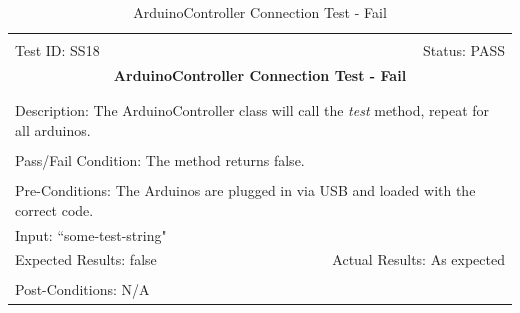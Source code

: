 \documentclass[11pt]{article}
\begin{document}
\begin{center}
\begin{table}[H]
\begin{tabular}{|l r|}\hline&\\[-2mm]
	Test ID: SS18	&Status: PASS\\[-3mm]
	\multicolumn{2}{|c|}{\textbf{\large{ArduinoController Connection Test - Fail}}}\\&\\\hline&\\[-3mm]
	\multicolumn{2}{|p{\textwidth}|}{Description: The ArduinoController class will call the \textit{test} method, repeat for all arduinos.}\\[1mm]\hline&\\[-3mm]
	\multicolumn{2}{|p{\textwidth}|}{Pass/Fail Condition: The method returns false.}\\[1mm]\hline&\\[-3mm]
	\multicolumn{2}{|p{\textwidth}|}{Pre-Conditions: The Arduinos are plugged in via USB and loaded with the correct code.}\\[4mm]
	\multicolumn{2}{|p{\textwidth}|}{Input: ``some-test-string"}\\[2mm]\hline
	\multicolumn{1}{|p{0.49\textwidth}}{Expected Results: false}	&\multicolumn{1}{|p{0.45\textwidth}|}{Actual Results: As expected}\\\hline&\\[-3mm]
	\multicolumn{2}{|p{\textwidth}|}{Post-Conditions: N/A}\\\hline
\end{tabular}
\caption{ArduinoController Connection Test - Fail}
\end{table}
\end{center}
\end{document}
